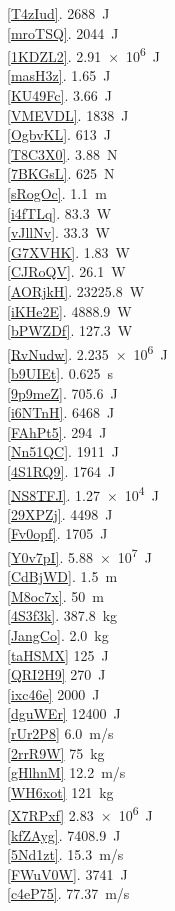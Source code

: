 \documentclass[main.tex]{subfiles}
\begin{document}
\begin{multicols}{2}
\ref{T4zIud}. \SI{2688}{J}\\
\ref{mroTSQ}. \SI{2044}{J}\\
\ref{1KDZL2}. \SI{2.91e6}{J}\\
\ref{masH3z}. \SI{1.65}{J}\\
\ref{KU49Fc}. \SI{3.66}{J}\\
\ref{VMEVDL}. \SI{1838}{J}\\
\ref{OgbvKL}. \SI{613}{J}\\
\ref{T8C3X0}. \SI{3.88}{N}\\
\ref{7BKGsL}. \SI{625}{N}\\
\ref{sRogOc}. \SI{1.1}{m}\\
\ref{i4fTLq}. \SI{83.3}{W}\\
\ref{vJllNv}. \SI{33.3}{W}\\
\ref{G7XVHK}. \SI{1.83}{W}\\
\ref{CJRoQV}. \SI{26.1}{W}\\
\ref{AORjkH}. \SI{23225.8}{W}\\
\ref{iKHe2E}. \SI{4888.9}{W}\\
\ref{bPWZDf}. \SI{127.3}{W}\\
\ref{RvNudw}. \SI{2.235e6}{J}\\
\ref{b9UIEt}. \SI{0.625}{s}\\
\ref{9p9meZ}. \SI{705.6}{J}\\
\ref{i6NTnH}. \SI{6468}{J}\\
\ref{FAhPt5}. \SI{294}{J}\\
\ref{Nn51QC}. \SI{1911}{J}\\
\ref{4S1RQ9}. \SI{1764}{J}\\
\ref{NS8TFJ}. \SI{1.27e4}{J}\\
\ref{29XPZj}. \SI{4498}{J}\\
\ref{Fv0opf}. \SI{1705}{J}\\
\ref{Y0v7pI}. \SI{5.88e7}{J}\\
\ref{CdBjWD}. \SI{1.5}{m}\\
\ref{M8oc7x}. \SI{50}{m}\\
\ref{4S3f3k}. \SI{387.8}{kg}\\
\ref{JangCo}. \SI{2.0}{kg}\\
\ref{taHSMX} \SI{125}{J}\\
\ref{QRI2H9} \SI{270}{J}\\
\ref{ixc46e} \SI{2000}{J}\\
\ref{dguWEr} \SI{12400}{J}\\
\ref{rUr2P8} \SI{6.0}{m/s}\\
\ref{2rrR9W} \SI{75}{kg}\\
\ref{gHlhnM} \SI{12.2}{m/s}\\
\ref{WH6xot} \SI{121}{kg}\\
\ref{X7RPxf} \SI{2.83e6}{J}\\
\ref{kfZAyg}. \SI{7408.9}{J}\\
\ref{5Nd1zt}. \SI{15.3}{m/s}\\
\ref{FWuV0W}. \SI{3741}{J}\\
\ref{c4eP75}. \SI{77.37}{m/s}\\
\end{multicols}
\end{document}
